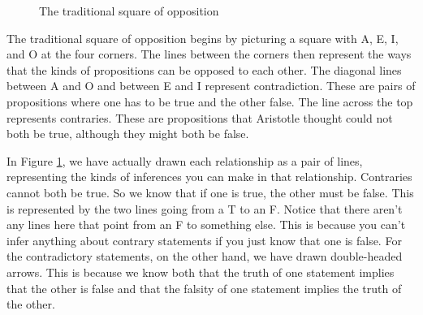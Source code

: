 \begin{figure}
\begin{mdframed}[style=mytablebox]
\begin{center}
\end{center}
\end{mdframed}
\caption{The traditional square of opposition}
\label{fig:traditionalsquare}
\end{figure}

The traditional square of opposition begins by picturing a square with A, E, I, and O at the four corners. The lines between the corners then represent the ways that the kinds of propositions can be opposed to each other. The diagonal lines between A and O and between E and I represent contradiction. These are pairs of propositions where one has to be true and the other false. The line across the top represents contraries. These are propositions that Aristotle thought could not both be true, although they might both be false. 

In Figure \ref{fig:traditionalsquare}, we have actually drawn each relationship as a pair of lines, representing the kinds of inferences you can make in that relationship. Contraries cannot both be true. So we know that if one is true, the other must be false. This is represented by the two lines going from a T to an F. Notice that there aren't any lines here that point from an F to something else. This is because you can't infer anything about contrary statements if you just know that one is false. For the contradictory statements, on the other hand, we have drawn double-headed arrows. This is because we know both that the truth of one statement implies that the other is false and that the falsity of one statement implies the truth of the other. 

